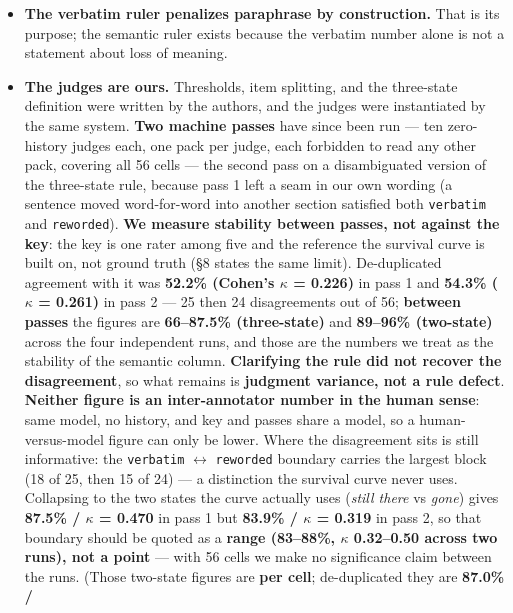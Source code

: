 \documentclass[
]{article}
\begin{document}
\begin{itemize}
\item
  \textbf{The verbatim ruler penalizes paraphrase by construction.} That
  is its purpose; the semantic ruler exists because the verbatim number
  alone is not a statement about loss of meaning.
\item
  \textbf{The judges are ours.} Thresholds, item splitting, and the
  three-state definition were written by the authors, and the judges
  were instantiated by the same system. \textbf{Two machine passes} have
  since been run --- ten zero-history judges each, one pack per judge,
  each forbidden to read any other pack, covering all 56 cells --- the
  second pass on a disambiguated version of the three-state rule,
  because pass 1 left a seam in our own wording (a sentence moved
  word-for-word into another section satisfied both \texttt{verbatim}
  and \texttt{reworded}). \textbf{We measure stability between passes,
  not against the key}: the key is one rater among five and the
  reference the survival curve is built on, not ground truth (§8 states
  the same limit). De-duplicated agreement with it was \textbf{52.2\%
  (Cohen's \ensuremath{\kappa} = 0.226)} in pass 1 and \textbf{54.3\%
  (\ensuremath{\kappa} = 0.261)} in pass 2 --- 25 then 24 disagreements
  out of 56; \textbf{between passes} the figures are \textbf{66--87.5\%
  (three-state)} and \textbf{89--96\% (two-state)} across the four
  independent runs, and those are the numbers we treat as the stability
  of the semantic column. \textbf{Clarifying the rule did not recover
  the disagreement}, so what remains is \textbf{judgment variance, not a
  rule defect}. \textbf{Neither figure is an inter-annotator number in
  the human sense}: same model, no history, and key and passes share a
  model, so a human-versus-model figure can only be lower. Where the
  disagreement sits is still informative: the \texttt{verbatim}
  \ensuremath{\leftrightarrow} \texttt{reworded} boundary carries the
  largest block (18 of 25, then 15 of 24) --- a distinction the survival
  curve never uses. Collapsing to the two states the curve actually uses
  (\emph{still there} vs \emph{gone}) gives \textbf{87.5\% /
  \ensuremath{\kappa} = 0.470} in pass 1 but \textbf{83.9\% /
  \ensuremath{\kappa} = 0.319} in pass 2, so that boundary should be
  quoted as a \textbf{range (83--88\%, \ensuremath{\kappa} 0.32--0.50
  across two runs), not a point} --- with 56 cells we make no
  significance claim between the runs. (Those two-state figures are
  \textbf{per cell}; de-duplicated they are \textbf{87.0\% /
}
\end{itemize}
\end{document}

